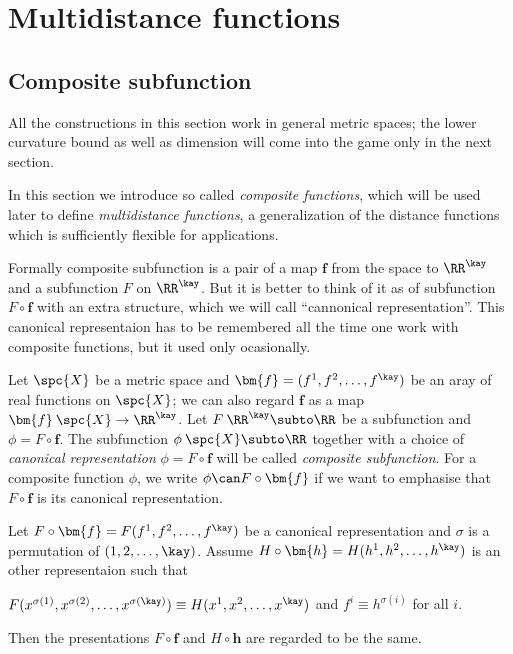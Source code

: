 \chapter{Multidistance functions}


\section{Composite  subfunction}\label{sec:composite}

All the constructions in this section 
work in general metric spaces;
the lower curvature bound as well as dimension 
will come into the game only in the next section.

In this section
we introduce so called \emph{composite functions},
which will be used later to define \emph{multidistance functions},
a generalization of the distance functions 
which 
is sufficiently flexible for applications.

Formally composite  subfunction is a pair of 
a map $\bm{f}$ from the space to $\RR^\kay$
and a subfunction $F$ on $\RR^\kay$.
But it is better to think of it as of subfunction $F\circ \bm{f}$
with an extra structure, which we will call ``cannonical representation''.
This canonical representaion has to be remembered all the time one work with composite functions, but it used only ocasionally.

Let $\spc{X}$ be a metric space
and $\bm{f}=(f^1,f^2,\dots,f^\kay)$ be an aray of real functions on $\spc{X}$; we can also regard $\bm{f}$ as a map $\bm{f}\:\spc{X}\to\RR^\kay$.
Let $F\:\RR^\kay\subto\RR$ be a subfunction and $\phi=F\circ\bm{f}$.
The subfunction $\phi\:\spc{X}\subto\RR$ together with a choice of \emph{canonical representation} $\phi=F\circ\bm{f}$ will be called \emph{composite subfunction}.
For a composite function $\phi$,
we write $\phi\can F\circ\bm{f}$ if we want to emphasise that $F\circ\bm{f}$ is its canonical representation.

Let $F\circ\bm{f}=F(f^1,f^2,\dots,f^\kay)$ be a canonical representation and $\sigma$ is a permutation of $(1,2,\dots,\kay)$.
Assume $H\circ\bm{h}=H(h^1,h^2,\dots,h^\kay)$ is an other representaion such that
\begin{clm}{}\label{clm:F=H}
$F(x^{\sigma(1)},x^{\sigma(2)},\dots,x^{\sigma(\kay)})
\equiv
H(x^1,x^2,\dots,x^\kay)$
and
$f^i\equiv h^{\sigma(i)}$
for all $i$.
\end{clm}
\noi Then the presentations $F\circ\bm{f}$ and $H\circ\bm{h}$
are regarded to be the same.


